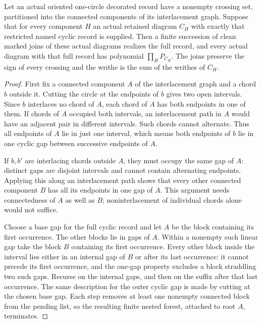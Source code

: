 \begin{lemma}\label{mp:blocks}
Let an actual oriented one-circle decorated record have a nonempty
crossing set, partitioned into the connected components of its
interlacement graph. Suppose that for every component $H$ an actual retained diagram
$C_H$ with exactly that restricted named cyclic record is supplied.
Then a finite succession of clean marked joins of these actual diagrams
realizes the full record, and every actual diagram with that full record
has polynomial $\prod_H P_{C_H}$. The joins preserve the sign of every
crossing and the writhe is the sum of the writhes of $C_H$.
\end{lemma}
\begin{proof}
First fix a connected component $A$ of the interlacement graph and a
chord $b$ outside it. Cutting the circle at the endpoints of $b$ gives
two open intervals. Since $b$ interlaces no chord of $A$, each chord
of $A$ has both endpoints in one of them. If chords of $A$ occupied
both intervals, an interlacement path in $A$ would have an adjacent
pair in different intervals. Such chords cannot alternate. Thus all
endpoints of $A$ lie in just one interval, which means both endpoints
of $b$ lie in one cyclic gap between successive endpoints of $A$.

If $b,b'$ are interlacing chords outside $A$, they must occupy the same
gap of $A$: distinct gaps are disjoint intervals and cannot contain
alternating endpoints. Applying this along an interlacement path shows
that every other connected component $B$ has all its endpoints in one
gap of $A$. This argument needs connectedness of $A$ as well as $B$;
noninterlacement of individual chords alone would not suffice.

Choose a base gap for the full cyclic record and let $A$ be the block
containing its first occurrence. The other blocks lie in gaps of $A$.
Within a nonempty such linear gap take the block $B$ containing its
first occurrence. Every other block inside the interval lies either in
an internal gap of $B$ or after its last occurrence: it cannot precede
its first occurrence, and the one-gap property excludes a block
straddling two such gaps. Recurse on the internal gaps, and then on
the suffix after that last occurrence. The same description for the
outer cyclic gap is made by cutting at the chosen base gap. Each step
removes at least one nonempty connected block from the pending list,
so the resulting finite nested forest, attached to root $A$, terminates.


\end{proof}

